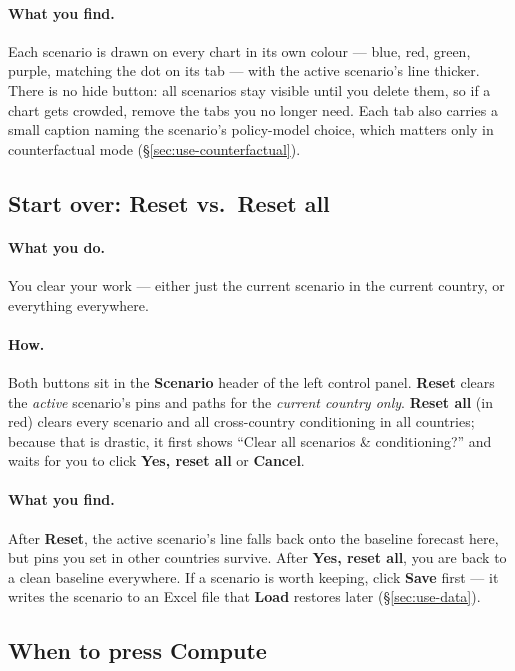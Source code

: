 \documentclass[11pt]{article}
\theoremstyle{definition}
\theoremstyle{remark}
\begin{document}
\paragraph{What you find.} Each scenario is drawn on every chart in its own colour
--- blue, red, green, purple, matching the dot on its tab --- with the active
scenario's line thicker. There is no hide button: all scenarios stay visible until
you delete them, so if a chart gets crowded, remove the tabs you no longer need.
Each tab also carries a small caption naming the scenario's policy-model choice,
which matters only in counterfactual mode (\S\ref{sec:use-counterfactual}).

\subsection{Start over: Reset vs.\ Reset all}

\paragraph{What you do.} You clear your work --- either just the current scenario in
the current country, or everything everywhere.

\paragraph{How.} Both buttons sit in the \textbf{Scenario} header of the left
control panel. \textbf{Reset} clears the \emph{active} scenario's pins and paths for
the \emph{current country only}. \textbf{Reset all} (in red) clears every scenario
and all cross-country conditioning in all countries; because that is drastic, it
first shows ``Clear all scenarios \& conditioning?'' and waits for you to click
\textbf{Yes, reset all} or \textbf{Cancel}.

\paragraph{What you find.} After \textbf{Reset}, the active scenario's line falls
back onto the baseline forecast here, but pins you set in other countries survive.
After \textbf{Yes, reset all}, you are back to a clean baseline everywhere. If a
scenario is worth keeping, click \textbf{Save} first --- it writes the scenario to
an Excel file that \textbf{Load} restores later (\S\ref{sec:use-data}).

\subsection{When to press Compute}
\end{document}
